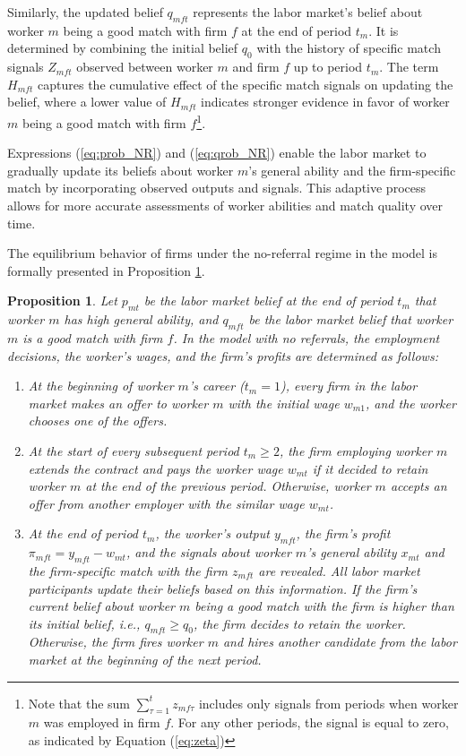 \documentclass[12pt]{article}
\newtheorem{proposition}{Proposition}
\begin{document}
Similarly, the updated belief $q_{mft}$ represents the labor market's belief about worker $m$ being a good match with firm $f$ at the end of period $t_m$. It is determined by combining the initial belief $q_0$ with the history of specific match signals $Z_{mft}$ observed between worker $m$ and firm $f$ up to period $t_m$. The term $H_{mft}$ captures the cumulative effect of the specific match signals on updating the belief, where a lower value of $H_{mft}$ indicates stronger evidence in favor of worker $m$ being a good match with firm $f$\footnote{Note that the sum $\sum_{\tau = 1}^t z_{mf\tau}$ includes only signals from periods when worker $m$ was employed in firm $f$. For any other periods, the signal is equal to zero, as indicated by Equation (\ref{eq:zeta})}. 

Expressions (\ref{eq:prob_NR}) and (\ref{eq:qrob_NR}) enable the labor market to gradually update its beliefs about worker $m$'s general ability and the firm-specific match by incorporating observed outputs and signals. This adaptive process allows for more accurate assessments of worker abilities and match quality over time.

The equilibrium behavior of firms under the no-referral regime in the model is formally presented in Proposition \ref{prop:equil_no_referrals}.

\begin{proposition}\label{prop:equil_no_referrals}
Let $p_{mt}$ be the labor market belief at the end of period $t_m$ that worker $m$ has high general ability, and $q_{mft}$ be the labor market belief that worker $m$ is a good match with firm $f$. In the model with no referrals, the employment decisions, the worker's wages, and the firm's profits are determined as follows:
    \begin{enumerate}[label={\roman*})]
        \item At the beginning of worker $m$'s career ($t_m = 1$), every firm in the labor market makes an offer to worker $m$ with the initial wage $w_{m1}$, and the worker chooses one of the offers.
        \item At the start of every subsequent period $t_m \geq 2$, the firm employing worker $m$ extends the contract and pays the worker wage $w_{mt}$ if it decided to retain worker $m$ at the end of the previous period. Otherwise, worker $m$ accepts an offer from another employer with the similar wage $w_{mt}$.
        \item At the end of period $t_m$, the worker's output $y_{mft}$, the firm's profit $\pi_{mft} = y_{mft} - w_{mt}$, and the signals about worker $m$'s general ability $x_{mt}$ and the firm-specific match with the firm $z_{mft}$ are revealed. All labor market participants update their beliefs based on this information. If the firm's current belief about worker $m$ being a good match with the firm is higher than its initial belief, i.e., $q_{mft}\geq q_0$, the firm decides to retain the worker. Otherwise, the firm fires worker $m$ and hires another candidate from the labor market at the beginning of the next period.
    \end{enumerate}
\end{proposition}
\end{document}
